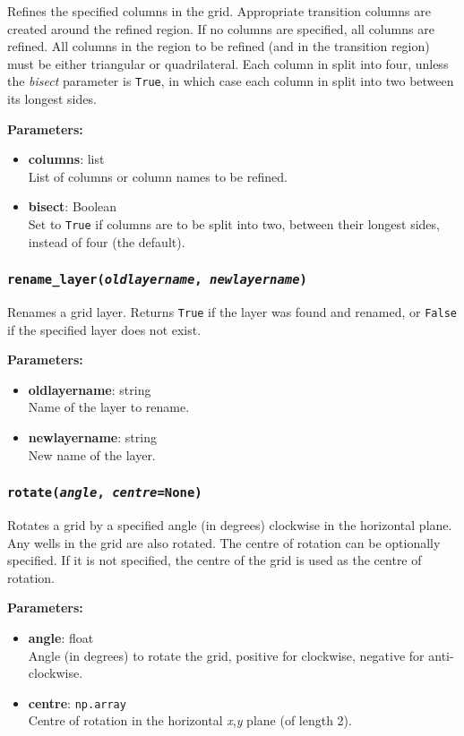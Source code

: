 Refines the specified columns in the grid.  Appropriate transition columns are created around the refined region.  If no columns are specified, all columns are refined.  All columns in the region to be refined (and in the transition region) must be either triangular or quadrilateral.  Each column in split into four, unless the \emph{bisect} parameter is \texttt{True}, in which case each column in split into two between its longest sides.

\textbf{Parameters:}
\begin{itemize}
  \item \textbf{columns}: list\\
    List of columns or column names to be refined.
  \item \textbf{bisect}: Boolean\\
    Set to \texttt{True} if columns are to be split into two, between their longest sides, instead of four (the default).
\end{itemize}

\subsubsection{\texttt{rename\_layer(\emph{oldlayername}, \emph{newlayername})}}

Renames a grid layer.  Returns \texttt{True} if the layer was found and renamed, or \texttt{False} if the specified layer does not exist.

\textbf{Parameters:}
\begin{itemize}
  \item \textbf{oldlayername}: string\\
    Name of the layer to rename.
  \item \textbf{newlayername}: string\\
    New name of the layer.
\end{itemize}

\subsubsection{\texttt{rotate(\emph{angle}, \emph{centre}=\texttt{None})}}

Rotates a grid by a specified angle (in degrees) clockwise in the horizontal plane.  Any wells in the grid are also rotated.  The centre of rotation can be optionally specified.  If it is not specified, the centre of the grid is used as the centre of rotation.

\textbf{Parameters:}
\begin{itemize}
  \item \textbf{angle}: float\\
    Angle (in degrees) to rotate the grid, positive for clockwise, negative for anti-clockwise.
  \item \textbf{centre}: \texttt{np.array}\\
    Centre of rotation in the horizontal \emph{x},\emph{y} plane (of length 2).
\end{itemize}

